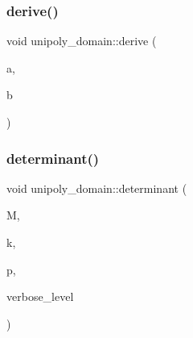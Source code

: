 \subsubsection{\texorpdfstring{derive()}{derive()}}
{\footnotesize\ttfamily void unipoly\+\_\+domain\+::derive (\begin{DoxyParamCaption}\item[{\mbox{\hyperlink{galois_8h_a77ca58de3d2da6172242493dd9c8aaa8}{unipoly\+\_\+object}}}]{a,  }\item[{\mbox{\hyperlink{galois_8h_a77ca58de3d2da6172242493dd9c8aaa8}{unipoly\+\_\+object}} \&}]{b }\end{DoxyParamCaption})}

\mbox{\label{classunipoly__domain_a460cfeb7de30e382da7f183b051e4a4f}} 
\subsubsection{\texorpdfstring{determinant()}{determinant()}}
{\footnotesize\ttfamily void unipoly\+\_\+domain\+::determinant (\begin{DoxyParamCaption}\item[{\mbox{\hyperlink{galois_8h_a77ca58de3d2da6172242493dd9c8aaa8}{unipoly\+\_\+object}} $\ast$}]{M,  }\item[{\mbox{\hyperlink{galois_8h_a09fddde158a3a20bd2dcadb609de11dc}{I\+NT}}}]{k,  }\item[{\mbox{\hyperlink{galois_8h_a77ca58de3d2da6172242493dd9c8aaa8}{unipoly\+\_\+object}} \&}]{p,  }\item[{\mbox{\hyperlink{galois_8h_a09fddde158a3a20bd2dcadb609de11dc}{I\+NT}}}]{verbose\+\_\+level }\end{DoxyParamCaption})}

\mbox{\label{classunipoly__domain_afd5cd0768747171ca1ef5b742d0b36fa}} 
